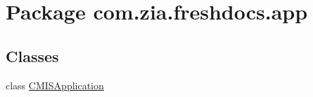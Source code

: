 \hypertarget{namespacecom_1_1zia_1_1freshdocs_1_1app}{\section{Package com.\-zia.\-freshdocs.\-app}
\label{namespacecom_1_1zia_1_1freshdocs_1_1app}
}
\subsection*{Classes}
\begin{DoxyCompactItemize}
\item 
class \hyperlink{classcom_1_1zia_1_1freshdocs_1_1app_1_1_c_m_i_s_application}{C\-M\-I\-S\-Application}
\end{DoxyCompactItemize}
